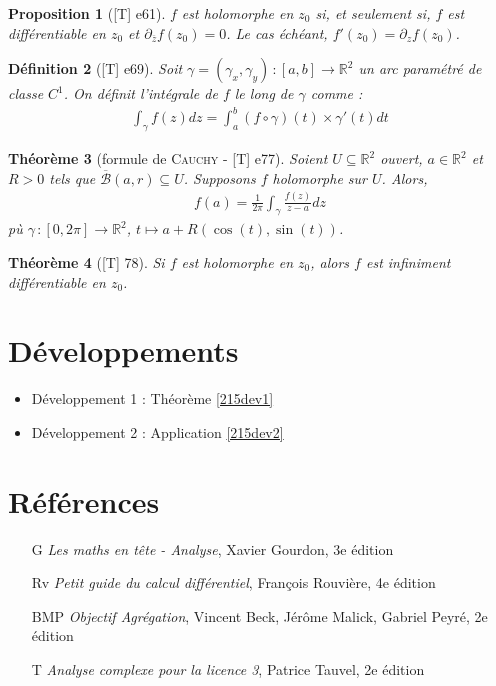 \documentclass[10pt, a4paper, parskip=full, twoside, twocolumn]{report}
\newtheorem{definition}{Définition}
\newtheorem{theorem}[definition]{Théorème}
\newtheorem{proposition}[definition]{Proposition}
\newcommand{\IR}{\mathbb{R}}
\newcommand{\B}{\mathcal{B}}
\begin{document}
\begin{proposition}[\textnormal{[T] e61}]
	$f$ est holomorphe en $z_0$ si, et seulement si, $f$ est différentiable en $z_0$ et $\partial_{\overline{z}}f(z_0) = 0$. Le cas échéant, $f'(z_0) = \partial_z f(z_0)$.
\end{proposition}

\begin{definition}[\textnormal{[T] e69}]
	Soit $\gamma = (\gamma_x, \gamma_y)\,\colon [a,b]\to \IR^2$ un arc paramétré de classe $C^1$.
	On définit l'\emph{intégrale de $f$ le long de $\gamma$} comme :
	\begin{align*}
		\int_{\gamma} f(z)dz = \int_{a}^{b} (f\circ \gamma)(t)\times \gamma'(t)dt
	\end{align*}
\end{definition}

\begin{theorem}[formule de \textsc{Cauchy} - \textnormal{[T] e77}]
	Soient $U\subseteq \IR^2$ ouvert, $a\in \IR^2$ et $R> 0$ tels que $\overline{\B}(a,r)\subseteq U$. Supposons $f$ holomorphe sur $U$. Alors,
	\begin{align*}
		f(a) = \frac{1}{2\pi}\int_{\gamma} \frac{f(z)}{z-a}dz
	\end{align*}
	pù $\gamma\,\colon [0,2\pi]\to \IR^2$, $t\mapsto a+R(\cos(t), \sin(t))$.
\end{theorem}

\begin{theorem}[\textnormal{[T] 78}]
	Si $f$ est holomorphe en $z_0$, alors $f$ est infiniment différentiable en $z_0$.
\end{theorem}

\section*{Développements}
\begin{itemize}
	\item Développement 1 : Théorème \ref{215dev1}
	\item Développement 2 : Application \ref{215dev2}
\end{itemize}

\section*{Références}
\begin{itemize}
	\item[G] \emph{Les maths en tête - Analyse}, Xavier Gourdon, 3e édition 
	\item[Rv] \emph{Petit guide du calcul différentiel}, François Rouvière, 4e édition
	\item[BMP] \emph{Objectif Agrégation}, Vincent Beck, Jérôme Malick, Gabriel Peyré, 2e édition
	\item[T] \emph{Analyse complexe pour la licence 3}, Patrice Tauvel, 2e édition
\end{itemize}
\end{document}
